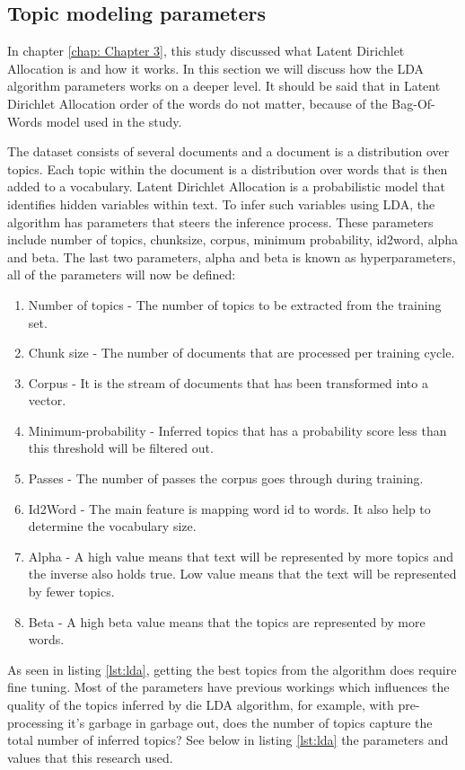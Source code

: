 \subsection{Topic modeling parameters} \label{ssec:LDA}

In chapter \ref{chap: Chapter 3}, this study discussed what Latent Dirichlet Allocation is and how it works. In this section we will discuss how the LDA algorithm parameters works on a deeper level. It should be said that in Latent Dirichlet Allocation order of the words do not matter, because of the Bag-Of-Words model used in the study. 

The dataset consists of several documents and a document is a distribution over topics. Each topic within the document is a distribution over words that is then added to a vocabulary. Latent Dirichlet Allocation is a probabilistic model that identifies hidden variables within text. To infer such variables using LDA, the algorithm has parameters that steers the inference process. These parameters include number of topics, chunksize, corpus, minimum probability, id2word, alpha and beta. The last two parameters, alpha and beta is known as hyperparameters, all of the parameters will now be defined:
\begin{enumerate}
    \item Number of topics - The number of topics to be extracted from the training set.
    \item Chunk size - The number of documents that are processed per training cycle.
    \item Corpus - It is the stream of documents that has been transformed into a vector.
    \item Minimum-probability - Inferred topics that has a probability score less than this threshold will be filtered out.
    \item Passes - The number of passes the corpus goes through during training.
    \item Id2Word - The main feature is mapping word id to words. It also help to determine the vocabulary size.
    \item Alpha - A high value means that text will be represented by more topics and the inverse also holds true. Low value means that the text will be represented by fewer topics.
    \item Beta - A high beta value means that the topics are represented by more words.
   
\end{enumerate}
As seen in listing \ref{lst:lda}, getting the best topics from the algorithm does require fine tuning. Most of the parameters have previous workings which influences the quality of the topics inferred by die LDA algorithm, for example, with pre-processing it's garbage in garbage out, does the number of topics capture the total number of inferred topics? See below in listing \ref{lst:lda} the parameters and values that this research used.
